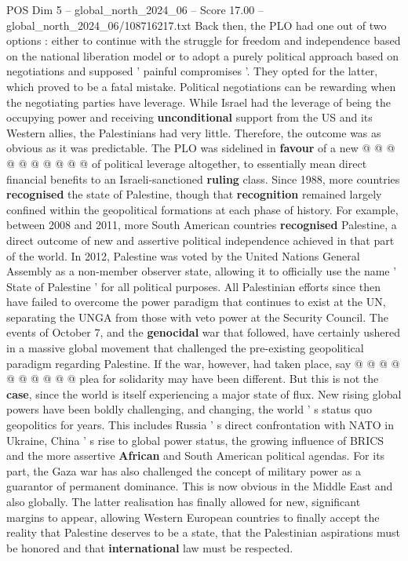 \begin{textsample}{POS Dim 5 – global\_north\_2024\_06 – Score 17.00 – global\_north\_2024\_06/108716217.txt}
Back then, the PLO had one out of two options : either to continue with the struggle for freedom and independence based on the national liberation model or to adopt a purely political approach based on negotiations and supposed ' painful compromises '.
They opted for the latter, which proved to be a fatal mistake.
Political negotiations can be rewarding when the negotiating parties have leverage.
While Israel had the leverage of being the occupying power and receiving \textbf{unconditional} support from the US and its Western allies, the Palestinians had very little.
Therefore, the outcome was as obvious as it was predictable.
The PLO was sidelined in \textbf{favour} of a new @ @ @ @ @ @ @ @ @ @ of political leverage altogether, to essentially mean direct financial benefits to an Israeli-sanctioned \textbf{ruling} class.
Since 1988, more countries \textbf{recognised} the state of Palestine, though that \textbf{recognition} remained largely confined within the geopolitical formations at each phase of history.
For example, between 2008 and 2011, more South American countries \textbf{recognised} Palestine, a direct outcome of new and assertive political independence achieved in that part of the world.
In 2012, Palestine was voted by the United Nations General Assembly as a non-member observer state, allowing it to officially use the name ' State of Palestine ' for all political purposes.
All Palestinian efforts since then have failed to overcome the power paradigm that continues to exist at the UN, separating the UNGA from those with veto power at the Security Council.
The events of October 7, and the \textbf{genocidal} war that followed, have certainly ushered in a massive global movement that challenged the pre-existing geopolitical paradigm regarding Palestine.
If the war, however, had taken place, say @ @ @ @ @ @ @ @ @ @ plea for solidarity may have been different.
But this is not the \textbf{case}, since the world is itself experiencing a major state of flux.
New rising global powers have been boldly challenging, and changing, the world ' s status quo geopolitics for years.
This includes Russia ' s direct confrontation with NATO in Ukraine, China ' s rise to global power status, the growing influence of BRICS and the more assertive \textbf{African} and South American political agendas.
For its part, the Gaza war has also challenged the concept of military power as a guarantor of permanent dominance.
This is now obvious in the Middle East and also globally.
The latter realisation has finally allowed for new, significant margins to appear, allowing Western European countries to finally accept the reality that Palestine deserves to be a state, that the Palestinian aspirations must be honored and that \textbf{international} law must be respected.

\end{textsample}
